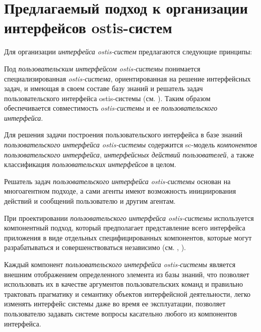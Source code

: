 \section{Предлагаемый подход к организации интерфейсов ostis-систем}
\label{sec_proposed_ui_approach}

Для организации \textit{интерфейса ostis-систем} предлагаются следующие принципы:
\begin{textitemize}
	\item Под \textit{пользовательским интерфейсом ostis-системы} понимается специализированная
    \textit{ostis-система}, ориентированная на решение интерфейсных задач, и имеющая в своем составе базу знаний и решатель задач пользовательского интерфейса ostis-системы (см. ). Таким образом обеспечивается совместимость \textit{ostis-системы} и ее \textit{пользовательского интерфейса}.
	\item Для решения задачи построения пользовательского интерфейса в базе знаний \textit{пользовательского интерфейса ostis-системы} содержится sc-модель \textit{компонентов пользовательского интерфейса}, \textit{интерфейсных действий пользователей}, а также классификация \textit{пользовательских интерфейсов} в целом.
	\item Решатель задач \textit{пользовательского интерфейса ostis-системы} основан на многоагентном подходе, а сами агенты имеют возможность инициирования действий и сообщений пользователю и другим агентам.
	\item При проектировании \textit{пользовательского интерфейса ostis-системы} используется компонентный подход, который предполагает представление всего интерфейса приложения в виде отдельных специфицированных компонентов, которые могут разрабатываться и совершенствоваться независимо (см. , ).
	\item Каждый компонент \textit{пользовательского интерфейса ostis-системы} является внешним отображением определенного элемента из базы знаний, что позволяет использовать их в качестве аргументов пользовательских команд и правильно трактовать прагматику и семантику объектов интерфейсной деятельности, легко изменять интерфейс системы даже во время ее эксплуатации, позволяет пользователю задавать системе вопросы касательно любого из компонентов интерфейса.

\end{textitemize}
